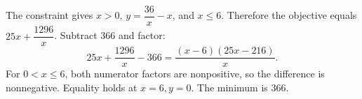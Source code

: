 The constraint gives $x>0$, $y=\dfrac{36}{x}-x$, and $x\le6$. Therefore the objective equals $25x+\dfrac{1296}{x}$. Subtract 366 and factor:
\[25x+\dfrac{1296}{x}-366=\dfrac{(x-6)(25x-216)}{x}.\]
For $0<x\le6$, both numerator factors are nonpositive, so the difference is nonnegative. Equality holds at $x=6,y=0$. The minimum is $\boxed{366}$.
